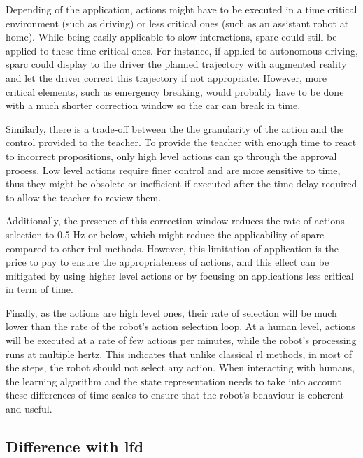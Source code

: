Depending of the application, actions might have to be executed in a time critical environment (such as driving) or less critical ones (such as an assistant robot at home). While being easily applicable to slow interactions, \gls{sparc} could still be applied to these time critical ones. For instance, if applied to autonomous driving, \gls{sparc} could display to the driver the planned trajectory with augmented reality and let the driver correct this trajectory if not appropriate. However, more critical elements, such as emergency breaking, would probably have to be done with a much shorter correction window so the car can break in time. 

Similarly, there is a trade-off between the the granularity of the action and the control provided to the teacher. To provide the teacher with enough time to react to incorrect propositions, only high level actions can go through the approval process. Low level actions require finer control and are more sensitive to time, thus they might be obsolete or inefficient if executed after the time delay required to allow the teacher to review them.

Additionally, the presence of this correction window reduces the rate of actions selection to 0.5 Hz or below, which might reduce the applicability of \gls{sparc} compared to other \gls{iml} methods. However, this limitation of application is the price to pay to ensure the appropriateness of actions, and this effect can be mitigated by using higher level actions or by focusing on applications less critical in term of time. 

Finally, as the actions are high level ones, their rate of selection will be much lower than the rate of the robot's action selection loop. At a human level, actions will be executed at a rate of few actions per minutes, while the robot's processing runs at multiple hertz. This indicates that unlike classical \gls{rl} methods, in most of the steps, the robot should not select any action. When interacting with humans, the learning algorithm and the state representation needs to take into account these differences of time scales to ensure that the robot's behaviour is coherent and useful.

\subsection{Difference with \gls{lfd}}

